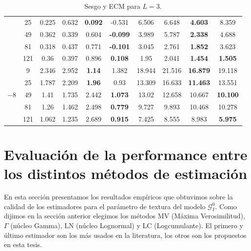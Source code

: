 \begin{table}[hbt]
\begin{tabular}{cc|SSSS|SSSS}
		&  25 	&  0.225 	&  0.632 	&  \bfseries{0.092} 	  	 &  -0.531 			    &  6.506 	    &  6.648 		&   \bfseries 4.603  	 &  8.359  \\ 
		&  49 	&  0.362	&  0.339 	&  0.604 	 				 &   \bfseries -0.099  	&  3.989 	    &  5.787 	    &   \bfseries 2.338  	 &  4.688  \\ 
		&  81 	&  0.318 	&  0.437 	&  0.771 	 				 &   \bfseries -0.101  	&  3.045 	    &  2.761 	    &   \bfseries 1.852  	 &  3.623  \\ 
		&  121 	&  0.36 	&  0.397 	&  0.896 	 				 &   \bfseries 0.108  	    &  1.95 	    &  2.041 	    &   \bfseries 1.454 	 &   \bfseries 1.505  \\ 
		\cmidrule(r){1-6}
		\cmidrule(r){7-10}									
		&  9 	&  2.346 	&  2.952    &   \bfseries 1.14       	&  1.382 				& 18.944		&  21.516 	&   \bfseries 16.879  	 &  19.118  \\ 
		&  25 	&  1.787 	&  2.209 	&   \bfseries 1.96  		&  0.93 				&  13.309 	 	&  16.633 	&   \bfseries 11.463  	 &  13.551  \\ 
		&  49 	&  1.41 	&  1.735 	&  2.442 				&   \bfseries 1.073  		&  13.02 	    &  12.658   &  10.667 	         &   \bfseries 10.100  \\ 
		&  81 	&  1.26 	&  1.462 	&  2.498 				&   \bfseries 0.779  		&  9.727 	    &  9.893 	&  10.468 	 		 &  10.278   \\ 
		&  121 	&  1.062 	&  1.235 	&  2.689 				&   \bfseries 0.915  		&  7.425 	    &  8.555 	&  8.983 	         &   \bfseries 5.975    \\ 
 		\bottomrule 								
	\end{tabular}										
	\caption{\label{SesgoyECMSinContConConstL=3} Sesgo y ECM para $L=3$.}									
\end{table}										


\section{Evaluación de la performance entre los distintos métodos de estimación}

En esta sección presentamos los resultados empíricos que obtuvimos sobre la calidad de los estimadores para el parámetro de textura del modelo $\mathcal G_I^0$. Como dijimos en la sección anterior elegimos los métodos MV (Máxima Verosimilitud), $\Gamma$ (núcleo Gamma), LN (núcleo Lognormal) y LC (Logcumulante). El primero y último estimador son los más usados en la literatura, los otros son los propuestos en esta tesis.

